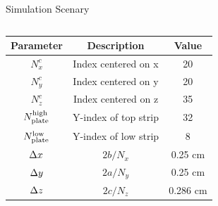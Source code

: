 \documentclass[aspectratio=169]{beamer}
\begin{document}
\begin{frame}{Simulation Scenary}
\begin{columns}
        \begin{column}{0.4\textwidth}
          \begin{table}[H]
          \resizebox{\textwidth}{!}
          {
            \begin{tabular}{|c|c|c|}
            \hline
            \textbf{Parameter}                           & \textbf{Description} & \textbf{Value} \\ \hline
            $N_x^c$                                      & Index centered on x  & 20             \\ \hline
            $N_y^c$                                      & Index centered on y  & 20             \\ \hline
            $N_z^c$                                      & Index centered on z  & 35             \\ \hline
            $N_{\textnormal{plate}}^{\textnormal{high}}$ & Y-index of top strip & 32             \\ \hline
            $N_{\textnormal{plate}}^{\textnormal{low}}$  & Y-index of low strip & 8              \\ \hline
            $\Delta x$                                        & ${2b}/{N_x}$         & 0.25 cm             \\ \hline
            $\Delta y$                                        & ${2a}/{N_y}$         & 0.25 cm             \\ \hline
            $\Delta z$                                        & ${2c}/{N_z}$         & 0.286 cm             \\ \hline
            \end{tabular}
          }
          \end{table}
        \end{column}

      \end{columns}


\end{frame}
\end{document}
